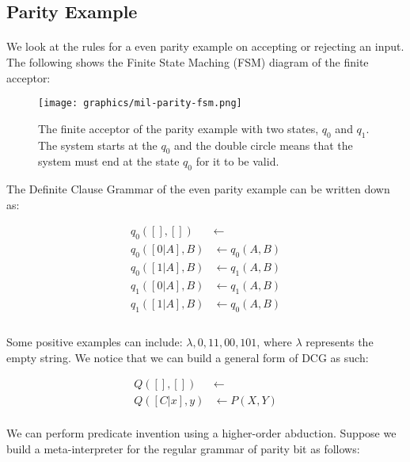 \documentclass{article}
\theoremstyle{plain}
\theoremstyle{definition}
\begin{document}
\begin{multicols}{2}
\subsection{Parity Example}

\paragraph{} We look at the rules for a even parity example on accepting or rejecting an input. The following shows the Finite State Maching (FSM) diagram of the finite acceptor:

\begin{figure}[H]
\centering
\texttt{[image: graphics/mil-parity-fsm.png]}
\caption{The finite acceptor of the parity example with two states, $q_0$ and $q_1$. The system starts at the $q_0$ and the double circle means that the system must end at the state $q_0$ for it to be valid.}
\end{figure}

The Definite Clause Grammar of the even parity example can be written down as:

\begin{align*}
q_0([], []) &\leftarrow\\
q_0([0|A], B) &\leftarrow q_0(A, B)\\
q_0([1|A], B) &\leftarrow q_1(A, B)\\
q_1([0|A], B) &\leftarrow q_1(A, B)\\
q_1([1|A], B) &\leftarrow q_0(A, B)\\
\end{align*}

\paragraph{} Some positive examples can include: $\lambda, 0, 11, 00, 101$, where $\lambda$ represents the empty string. We notice that we can build a general form of DCG as such:

\begin{align*}
Q([], []) &\leftarrow\\
Q([C|x],y) &\leftarrow P(X, Y)
\end{align*}

\paragraph{} We can perform predicate invention using a higher-order abduction. Suppose we build a meta-interpreter for the regular grammar of parity bit as follows:


\end{multicols}
\end{document}
